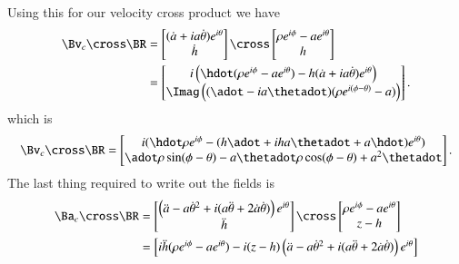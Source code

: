 {Using this for our velocity cross product we have
%
\begin{equation}\label{eqn:relativisticElectrodynamicsExamReflection:1310}
\begin{aligned}
\Bv_c \cross \BR
&=
\begin{bmatrix}
(\dot{a} + i a \dot{\theta}) e^{i\theta} \\
\dot{h}
\end{bmatrix}
\cross
\begin{bmatrix}
\rho e^{i\phi} - a e^{i\theta} \\
h
\end{bmatrix} \\
&=
\begin{bmatrix}
i\left(\hdot ( \rho e^{i\phi} - a e^{i\theta} ) - h (\dot{a} + i a \dot{\theta}) e^{i\theta} \right) \\
\Imag \left( ( \adot - i a \thetadot) (\rho e^{i(\phi - \theta)} - a) \right)
\end{bmatrix}.
\end{aligned}
\end{equation}
%
which is
%
\begin{equation}\label{eqn:relativisticElectrodynamicsExamReflection:970}
\Bv_c \cross \BR
=
\begin{bmatrix}
i( \hdot \rho e^{i\phi} - (h \adot + i h a \thetadot + a \hdot) e^{i\theta} ) \\
\adot \rho \sin(\phi - \theta) - a \thetadot \rho \cos(\phi - \theta) + a^2 \thetadot
\end{bmatrix}.
\end{equation}
%
The last thing required to write out the fields is
%
\begin{equation}\label{eqn:relativisticElectrodynamicsExamReflection:1330}
\begin{aligned}
\Ba_c \cross \BR
&=
\begin{bmatrix}
\left( \ddot{a} - a {\dot{\theta}}^2 + i ( a\ddot{\theta} + 2 \dot{a} \dot{\theta} ) \right) e^{i\theta} \\
\ddot{h}
\end{bmatrix}
\cross
\begin{bmatrix}
\rho e^{i\phi} - a e^{i\theta} \\
z - h
\end{bmatrix} \\
&=
\begin{bmatrix}
i \ddot{h} (\rho e^{i\phi} - a e^{i\theta} ) - i (z - h) \left( \ddot{a} - a {\dot{\theta}}^2 + i ( a\ddot{\theta} + 2 \dot{a} \dot{\theta} ) \right) e^{i\theta} \\

\end{bmatrix}
\end{aligned}
\end{equation}}
